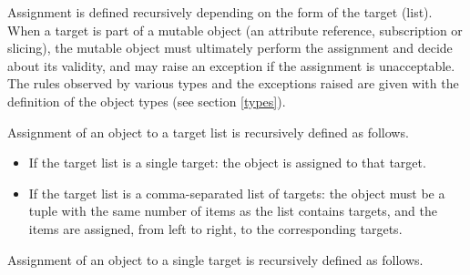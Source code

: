 Assignment is defined recursively depending on the form of the target
(list).  When a target is part of a mutable object (an attribute
reference, subscription or slicing), the mutable object must
ultimately perform the assignment and decide about its validity, and
may raise an exception if the assignment is unacceptable.  The rules
observed by various types and the exceptions raised are given with the
definition of the object types (see section \ref{types}).

Assignment of an object to a target list is recursively defined as
follows.

\begin{itemize}
\item
If the target list is a single target: the object is assigned to that
target.

\item
If the target list is a comma-separated list of targets: the object
must be a tuple with the same number of items as the list contains
targets, and the items are assigned, from left to right, to the
corresponding targets.

\end{itemize}

Assignment of an object to a single target is recursively defined as
follows.

